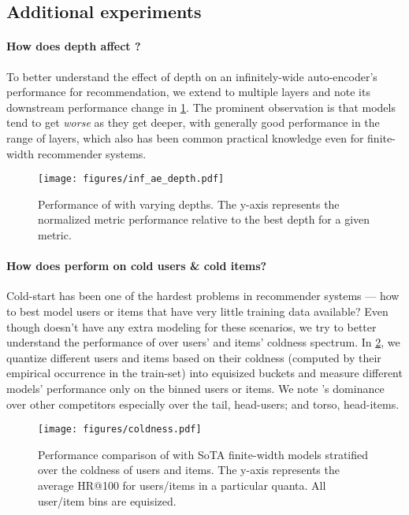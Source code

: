\documentclass{article}
\begin{document}
\subsection{Additional experiments} \label{appendix:extra_experiments}

\paragraph{How does depth affect \model?} To better understand the effect of depth on an infinitely-wide auto-encoder's performance for recommendation, we extend \model to multiple layers and note its downstream performance change in \cref{fig:inf_ae_depth}. The prominent observation is that models tend to get \emph{worse} as they get deeper, with generally good performance in the range of  layers, which also has been common practical knowledge even for finite-width recommender systems.

\begin{figure}[ht!] 
    \centering
    \texttt{[image: figures/inf\_ae\_depth.pdf]}
    \caption{Performance of \model with varying depths. The y-axis represents the normalized metric \ie performance relative to the best depth for a given metric.}
    \label{fig:inf_ae_depth}
\end{figure}

\paragraph{How does \model perform on cold users \& cold items?} Cold-start has been one of the hardest problems in recommender systems --- how to best model users or items that have very little training data available? Even though \model doesn't have any extra modeling for these scenarios, we try to better understand the performance of \model over users' and items' coldness spectrum. In \cref{fig:inf_ae_coldness}, we quantize different users and items based on their coldness (computed by their empirical occurrence in the train-set) into equisized buckets and measure different models' performance only on the binned users or items. We note \model's dominance over other competitors especially over the tail, head-users; and torso, head-items. 

\begin{figure}[ht!] 
    \centering
    \texttt{[image: figures/coldness.pdf]}
    \caption{Performance comparison of \model with SoTA finite-width models stratified over the coldness of users and items. The y-axis represents the average HR@100 for users/items in a particular quanta. All user/item bins are equisized.}
    \label{fig:inf_ae_coldness}
\end{figure}
\end{document}
